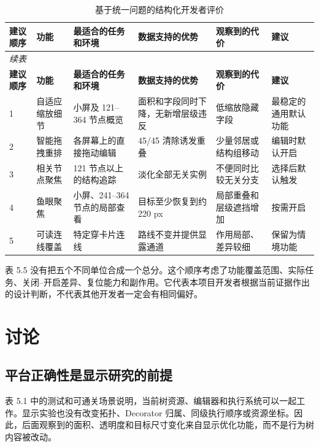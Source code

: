 \documentclass[11pt,a4paper,oneside,extrafontsizes]{memoir}
\begin{document}
\begin{center}
\small
\begin{longtable}{@{}p{} p{} p{} p{} p{} p{}@{}}
\caption{基于统一问题的结构化开发者评价}\label{tab:auto-10}\\
\toprule
\textbf{建议顺序} & \textbf{功能} & \textbf{最适合的任务和环境} & \textbf{数据支持的优势} & \textbf{观察到的代价} & \textbf{建议} \\
\midrule
\endfirsthead
\multicolumn{6}{l}{\small\itshape 续表}\\
\toprule
\textbf{建议顺序} & \textbf{功能} & \textbf{最适合的任务和环境} & \textbf{数据支持的优势} & \textbf{观察到的代价} & \textbf{建议} \\
\midrule
\endhead
1 & 自适应缩放细节 & 小屏及 121–364 节点概览 & 面积和字段同时下降，无新增层级违反 & 低缩放隐藏字段 & 最稳定的通用默认功能 \\
2 & 智能拖拽重排 & 各屏幕上的直接拖动编辑 & 45/45 清除诱发重叠 & 少量邻居或结构组移动 & 编辑时默认开启 \\
3 & 相关节点聚焦 & 121 节点以上的结构追踪 & 淡化全部无关实例 & 不便同时比较无关分支 & 选择后默认触发 \\
4 & 鱼眼聚焦 & 小屏、241–364 节点的局部查看 & 目标至少恢复到约 220 px & 局部重叠和层级遮挡增加 & 按需开启 \\
5 & 可读连线覆盖 & 特定穿卡片连线 & 路线不变并提供显露通道 & 作用局部、差异较细 & 保留为情境功能 \\
\bottomrule
\end{longtable}
\end{center}

表 5.5 没有把五个不同单位合成一个总分。这个顺序考虑了功能覆盖范围、实际任务、关闭–开启差异、复位能力和副作用。它代表本项目开发者根据当前证据作出的设计判断，不代表其他开发者一定会有相同偏好。

\chapter{讨论}

\section{平台正确性是显示研究的前提}

表 5.1 中的测试和可通关场景说明，当前树资源、编辑器和执行系统可以一起工作。显示实验也没有改变拓扑、Decorator 归属、同级执行顺序或资源坐标。因此，后面观察到的面积、透明度和目标尺寸变化来自显示优化功能，而不是行为树内容被改动。
\end{document}
